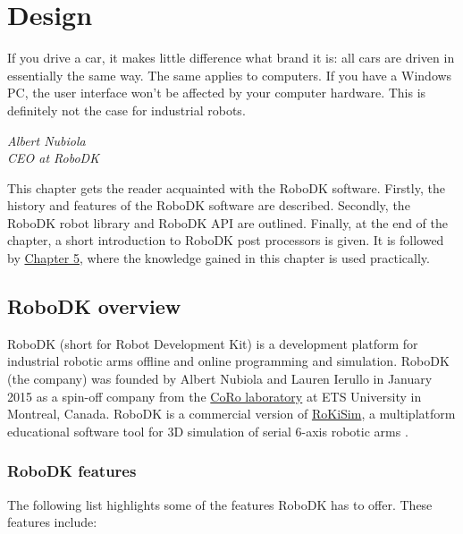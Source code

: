 \chapter{Design \label{chap:design}}



\epigraph{If you drive a car, it makes little difference what brand it is: all cars are driven
in essentially the same way. The same applies to computers. If you have a
Windows PC, the user interface won’t be affected by your computer hardware.
This is definitely not the case for industrial robots.}{\textit{Albert Nubiola \\ CEO at RoboDK}}

\par This chapter gets the reader acquainted with the RoboDK software. Firstly, the history and features of the RoboDK software are described. Secondly, the RoboDK robot library and RoboDK API are outlined. Finally, at the end of the chapter, a short introduction to RoboDK post processors is given. It is followed by  \hyperref[chap:implementation]{Chapter 5}, where the knowledge gained in this chapter is used practically. 

\section{RoboDK overview}

RoboDK (short for Robot Development Kit) is a development platform for industrial robotic arms offline and online programming and simulation. 
RoboDK (the company) was founded by Albert Nubiola and Lauren Ierullo in January 2015 as a spin-off company from the \href{https://en.etsmtl.ca/unites-de-recherche/coro/accueil?lang=en-CA}{CoRo laboratory}   at ETS University in Montreal, Canada. RoboDK is a commercial version of \href{https://www.parallemic.org/RoKiSim.html}{RoKiSim}, a multiplatform educational software tool for 3D simulation of serial 6-axis robotic arms \cite{robodkoverview}.

\subsection{RoboDK features}

The following list highlights some of the features RoboDK has to offer. These features include: 

